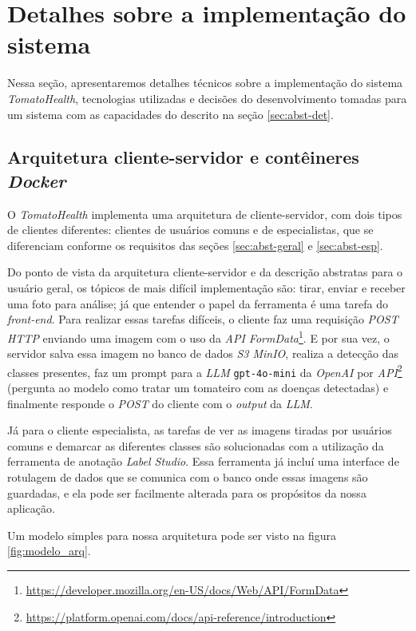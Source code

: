 \chapter{Detalhes sobre a implementação do sistema} \label{sec:implementacao_sistema}

Nessa seção, apresentaremos detalhes técnicos sobre a implementação do sistema \textit{TomatoHealth}, tecnologias utilizadas e decisões do desenvolvimento tomadas para um sistema com as capacidades do descrito na seção \ref{sec:abst-det}.

\section{Arquitetura cliente-servidor e contêineres \emph{Docker}}

O \emph{TomatoHealth} implementa uma arquitetura de cliente-servidor, com dois tipos de clientes diferentes: clientes de usuários comuns e de especialistas, que se diferenciam conforme os requisitos das seções \ref{sec:abst-geral} e \ref{sec:abst-esp}.

Do ponto de vista da arquitetura cliente-servidor e da descrição abstratas para o usuário geral, os tópicos de mais difícil implementação são: tirar, enviar e receber uma foto para análise; já que entender o papel da ferramenta é uma tarefa do \emph{front-end}. Para realizar essas tarefas difíceis, o cliente faz uma requisição \emph{POST HTTP} enviando uma imagem com o uso da \emph{API FormData}\footnote{\url{https://developer.mozilla.org/en-US/docs/Web/API/FormData}}. E por sua vez, o servidor salva essa imagem no banco de dados \emph{S3 MinIO}, realiza a detecção das classes presentes, faz um prompt para a \emph{LLM} \texttt{gpt-4o-mini} da \emph{OpenAI} por \emph{API}\footnote{\url{https://platform.openai.com/docs/api-reference/introduction}} (pergunta ao modelo como tratar um tomateiro com as doenças detectadas) e finalmente responde o \emph{POST} do cliente com o \emph{output} da \emph{LLM}.

Já para o cliente especialista, as tarefas de ver as imagens tiradas por usuários comuns e demarcar as diferentes classes são solucionadas com a utilização da ferramenta de anotação \emph{Label Studio}. Essa ferramenta já incluí uma interface de rotulagem de dados que se comunica com o banco onde essas imagens são guardadas, e ela pode ser facilmente alterada para os propósitos da nossa aplicação.

Um modelo simples para nossa arquitetura pode ser visto na figura \ref{fig:modelo_arq}.

